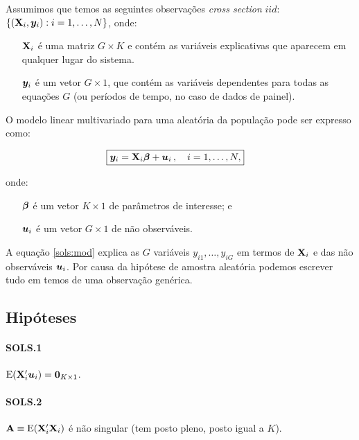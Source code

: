 \documentclass[11pt, oneside, a4paper, article]{article}
\numberwithin{equation}{section}
\begin{document}
Assumimos que temos as seguintes observações \textit{cross section} $iid$:
$\{ (\mathbf{X}_{i}, \boldsymbol{y}_{i}): i=1, \dots, N\}$, onde:

\vspace{-1 em}
\begin{itemize}[itemsep = -1ex]
\item [$\mathbf{X}_{i}$]  é uma matriz $G \times K$ e contém as variáveis explicativas que aparecem em qualquer lugar do sistema.
\item [$\boldsymbol{y}_{i}$]  é um vetor $G \times 1$, que contém as variáveis dependentes para todas as equações $G$ (ou períodos de tempo, no caso de dados de painel).
\end{itemize}

O modelo linear multivariado para uma  aleatória da população pode ser expresso como:

\vspace{-1 em}
\begin{align}\label{sols:mod}
	\Aboxed{
	\mbs{y}_{i} = \Xmat_{i} \betavec + \mbs{u}_{i} \, , \quad i=1, \dots, N,
}
\end{align}

\noindent
onde:

\vspace{-1 em}
\begin{itemize}[itemsep = -1ex]
\item [$\boldsymbol{\beta}$] é um vetor $K \times 1$ de parâmetros de interesse; e
\item [$\boldsymbol{u}_{i}$] é um vetor $G \times 1$ de não observáveis.
\end{itemize}

A equação \eqref{sols:mod} explica as $G$ variáveis $y_{i1}, \dots, y_{iG}$ em termos de $\mathbf{X}_{i}$ e das não observáveis $\boldsymbol{u}_{i}$.
Por causa da hipótese de amostra aleatória podemos escrever tudo em temos de uma observação genérica.

\subsection{Hipóteses}
\noindent
\citet[Sec.7.3.1]{wool-2010}

\paragraph{SOLS.1} $\text{E}(\mathbf{X}_{i}' \boldsymbol{u}_{i}) = \boldsymbol{0}_{K \times 1}$.
		
\paragraph{SOLS.2} $\mathbf{A} \equiv \text{E}( \mathbf{X}_{i}' \mathbf{X}_{i} )$ é não singular (tem posto pleno, posto igual a $K$). 
\end{document}
